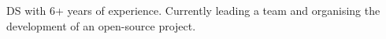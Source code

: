 \documentclass[10pt,a4paper,ragged2e,withhyper]{altacv}
\begin{document}


\makecvheader


\smallskip
DS with 6+ years of experience. 
Currently leading a team and organising the development of an open-source project.

\begin{paracol}{2}







\switchcolumn





% 

\end{paracol}
\end{document}
